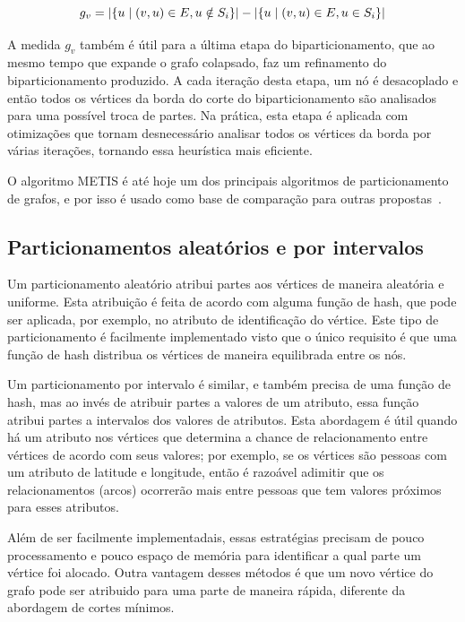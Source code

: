 \documentclass[conference]{IEEEtran}
\DeclarePairedDelimiter\abs{\lvert}{\rvert}
\begin{document}
\begin{equation}
    g_v = \abs{\{u \mid (v, u) \in E, u \notin S_i\}} -
          \abs{\{u \mid (v, u) \in E, u \in S_i\}}
\end{equation}

A medida $g_v$ também é útil para a última etapa do biparticionamento,
que ao mesmo tempo que expande o grafo colapsado, faz um refinamento do
biparticionamento produzido. A cada iteração desta etapa, um nó é
desacoplado e então todos os vértices da borda do corte do
biparticionamento são analisados para uma possível troca de partes. Na
prática, esta etapa é aplicada com otimizações que tornam desnecessário
analisar todos os vértices da borda por várias iterações, tornando essa
heurística mais eficiente.

O algoritmo METIS é até hoje um dos principais algoritmos de
particionamento de grafos, e por isso é usado como base de comparação
para outras propostas~\cite{baselinemetis}.


\subsection{Particionamentos aleatórios e por intervalos}
Um particionamento aleatório atribui partes aos vértices de maneira
aleatória e uniforme. Esta atribuição é feita de acordo com alguma
função de hash, que pode ser aplicada, por exemplo, no atributo
de identificação do vértice. Este tipo de particionamento é facilmente
implementado visto que o único requisito é que uma função de hash
distribua os vértices de maneira equilibrada entre os nós.

Um particionamento por intervalo é similar, e também precisa de uma
função de hash, mas ao invés de atribuir partes a valores de um
atributo, essa função atribui partes a intervalos dos valores de
atributos. Esta abordagem é útil quando há um atributo nos vértices que
determina a chance de relacionamento entre vértices de acordo com
seus valores; por exemplo, se os vértices são pessoas com um atributo
de latitude e longitude, então é razoável adimitir que os
relacionamentos (arcos) ocorrerão mais entre pessoas que tem valores
próximos para esses atributos.

Além de ser facilmente implementadais, essas estratégias precisam de
pouco processamento e pouco espaço de memória para identificar a qual
parte um vértice foi alocado. Outra vantagem desses métodos é que um
novo vértice do grafo pode ser atribuido para uma parte de maneira
rápida, diferente da abordagem de cortes mínimos.
\end{document}

